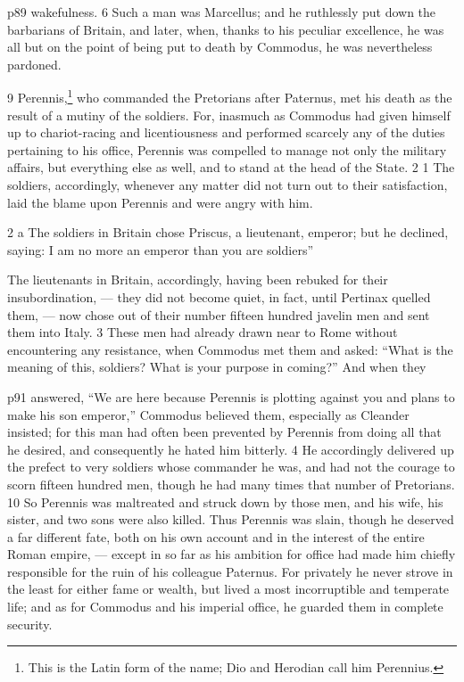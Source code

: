 p89 wakefulness. 6 Such a man was Marcellus; and he ruthlessly put down the barbarians of Britain, and later, when, thanks to his peculiar excellence, he was all but on the point of being put to death by Commodus, he was nevertheless pardoned.

9
Perennis,\texthebrew{⁠}\footnote{This is the Latin form of the name; Dio and Herodian call him Perennius.

} who commanded the Pretorians after Paternus, met his death as the result of a mutiny of the soldiers. For, inasmuch as Commodus had given himself up to chariot-racing and licentiousness and performed scarcely any of the duties pertaining to his office, Perennis was compelled to manage not only the military affairs, but everything else as well, and to stand at the head of the State. 2 1 The soldiers, accordingly, whenever any matter did not turn out to their satisfaction, laid the blame upon Perennis and were angry with him.

2 a The soldiers in Britain chose Priscus, a lieutenant, emperor; but he declined, saying: I am no more an emperor than you are soldiers''

The lieutenants in Britain, accordingly, having been rebuked for their insubordination, \texthebrew{—} they did not become quiet, in fact, until Pertinax quelled them, \texthebrew{—} now chose out of their number fifteen hundred javelin men and sent them into Italy. 3 These men had already drawn near to Rome without encountering any resistance, when Commodus met them and asked: ``What is the meaning of this, soldiers? What is your purpose in coming?'' And when they

p91 answered, ``We are here because Perennis is plotting against you and plans to make his son emperor,'' Commodus believed them, especially as Cleander insisted; for this man had often been prevented by Perennis from doing all that he desired, and consequently he hated him bitterly. 4 He accordingly delivered up the prefect to very soldiers whose commander he was, and had not the courage to scorn fifteen hundred men, though he had many times that number of Pretorians. 10 So Perennis was maltreated and struck down by those men, and his wife, his sister, and two sons were also killed. Thus Perennis was slain, though he deserved a far different fate, both on his own account and in the interest of the entire Roman empire, \texthebrew{—} except in so far as his ambition for office had made him chiefly responsible for the ruin of his colleague Paternus. For privately he never strove in the least for either fame or wealth, but lived a most incorruptible and temperate life; and as for Commodus and his imperial office, he guarded them in complete security.

